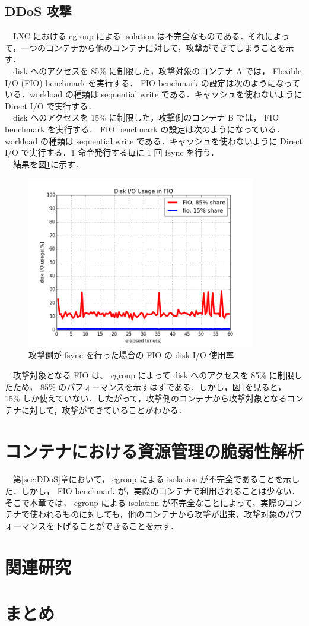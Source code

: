 \documentclass[graduation-thesis]{jsarticle}
\begin{document}
\subsection{DDoS 攻撃}
　LXC における cgroup による isolation は不完全なものである．それによって，一つのコンテナから他のコンテナに対して，攻撃ができてしまうことを示す．\\
　disk へのアクセスを 85\% に制限した，攻撃対象のコンテナ A では， Flexible I/O (FIO) benchmark を実行する． FIO benchmark の設定は次のようになっている．workload の種類は sequential write である．キャッシュを使わないように Direct I/O で実行する．\\
　disk へのアクセスを 15\% に制限した，攻撃側のコンテナ B では， FIO benchmark を実行する． FIO benchmark の設定は次のようになっている． workload の種類は sequential write である．キャッシュを使わないように Direct I/O で実行する．1 命令発行する毎に 1 回 fsync を行う．\\
　結果を図\ref{fig:fsync1}に示す．\\
\begin{figure}[H]
	\begin{center}
		\includegraphics[width=10.0cm]{images/fio_fsync1.png}
		\caption{攻撃側が fsync を行った場合の FIO の disk I/O 使用率}
		\label{fig:fsync1}
	\end{center}
\end{figure}
　攻撃対象となる FIO は、 cgroup によって disk へのアクセスを 85\% に制限したため， 85\% のパフォーマンスを示すはずである．しかし，図\ref{fig:fsync1}を見ると， 15\% しか使えていない．したがって，攻撃側のコンテナから攻撃対象となるコンテナに対して，攻撃ができていることがわかる．\\

\clearpage
\section{コンテナにおける資源管理の脆弱性解析}
　第\ref{sec:DDoS}章において， cgroup による isolation が不完全であることを示した．しかし， FIO benchmark が，実際のコンテナで利用されることは少ない．そこで本章では， cgroup による isolation が不完全なことによって，実際のコンテナで使われるものに対しても，他のコンテナから攻撃が出来，攻撃対象のパフォーマンスを下げることができることを示す．
\label{sec:analysis}

\clearpage
\section{関連研究}
\label{sec:relative}

\clearpage
\section{まとめ}
\label{sec:conclusion}
\end{document}
